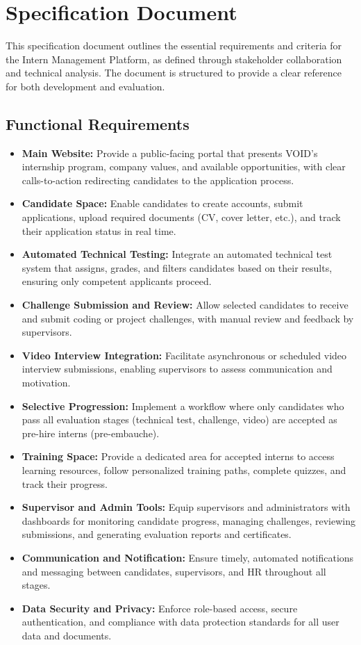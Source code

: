 \section{Specification Document}
\noindent
This specification document outlines the essential requirements and criteria for the Intern Management Platform, as defined through stakeholder collaboration and technical analysis. The document is structured to provide a clear reference for both development and evaluation.

\subsection{Functional Requirements}
\begin{itemize}
    \item \textbf{Main Website:} Provide a public-facing portal that presents VOID's internship program, company values, and available opportunities, with clear calls-to-action redirecting candidates to the application process.
    \item \textbf{Candidate Space:} Enable candidates to create accounts, submit applications, upload required documents (CV, cover letter, etc.), and track their application status in real time.
    \item \textbf{Automated Technical Testing:} Integrate an automated technical test system that assigns, grades, and filters candidates based on their results, ensuring only competent applicants proceed.
    \item \textbf{Challenge Submission and Review:} Allow selected candidates to receive and submit coding or project challenges, with manual review and feedback by supervisors.
    \item \textbf{Video Interview Integration:} Facilitate asynchronous or scheduled video interview submissions, enabling supervisors to assess communication and motivation.
    \item \textbf{Selective Progression:} Implement a workflow where only candidates who pass all evaluation stages (technical test, challenge, video) are accepted as pre-hire interns (pre-embauche).
    \item \textbf{Training Space:} Provide a dedicated area for accepted interns to access learning resources, follow personalized training paths, complete quizzes, and track their progress.
    \item \textbf{Supervisor and Admin Tools:} Equip supervisors and administrators with dashboards for monitoring candidate progress, managing challenges, reviewing submissions, and generating evaluation reports and certificates.
    \item \textbf{Communication and Notification:} Ensure timely, automated notifications and messaging between candidates, supervisors, and HR throughout all stages.
    \item \textbf{Data Security and Privacy:} Enforce role-based access, secure authentication, and compliance with data protection standards for all user data and documents.
\end{itemize}


